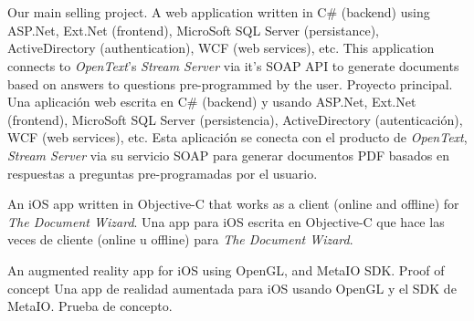 \section{}




    {\ml
    {Our main selling project. A web application written in C\# (backend) using ASP.Net,
    Ext.Net (frontend), MicroSoft SQL Server (persistance), ActiveDirectory
    (authentication), WCF (web services), etc. This application connects to
    \textit{OpenText}'s \textit{Stream Server} via it's SOAP API to generate
    documents based on answers to questions pre-programmed by the user.}
    {Proyecto principal. Una aplicación web escrita en C\# (backend) y usando
    ASP.Net, Ext.Net (frontend), MicroSoft SQL Server (persistencia),
    ActiveDirectory (autenticación), WCF (web services), etc. Esta aplicación
    se conecta con el producto de \textit{OpenText}, \textit{Stream Server} via
    su servicio SOAP para generar documentos PDF basados en respuestas a
    preguntas pre-programadas por el usuario.}
}


    {\ml
    {An iOS app written in Objective-C that works as a client (online and
    offline) for \textit{The Document Wizard}.}
    {Una app para iOS escrita en Objective-C que hace las veces de cliente
    (online u offline) para \textit{The Document Wizard}.}
}


    {\ml
    {An augmented reality app for iOS using OpenGL, and MetaIO SDK. Proof of concept}
    {Una app de realidad aumentada para iOS usando OpenGL y el SDK de MetaIO. Prueba de concepto.}
}

